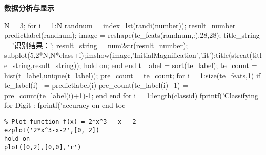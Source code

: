 \textcolor[rgb]{0.98,0.00,0.00}{\textbf{数据分析与显示}}
\begin{python}
    N = 3;
    for i = 1:N
        randnum = index_lst(randi(number));
        result_number= predictlabel(randnum);
        image = reshape(te_feats(randnum,:),28,28);
        title_string = '识别结果：';
        result_string = num2str(result_number);
        subplot(5,2*N,N*class+i);imshow(image,'InitialMagnification','fit');title(strcat(title_string,result_string));
        hold on;
    end
end
t_label = sort(te_label);
te_count = hist(t_label,unique(t_label));
pre_count = te_count;
for i = 1:size(te_feats,1)    
    if te_label(i) ~= predictlabel(i)
        pre_count(te_label(i)+1) = pre_count(te_label(i)+1)-1;
    end
end
for i = 1:length(classid)
    fprintf('Classifying for Digit :  %
    fprintf('accuracy on %
end
toc
\end{python}


\lstset{language=Matlab}

\begin{lstlisting}
% Plot function f(x) = 2*x^3 - x - 2
ezplot('2*x^3-x-2',[0, 2])
hold on
plot([0,2],[0,0],'r')
\end{lstlisting}

